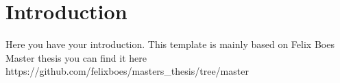 \chapter{Introduction}
Here you have your introduction. This template is mainly based on Felix Boes Master thesis you can find it here https://github.com/felixboes/masters\_thesis/tree/master
